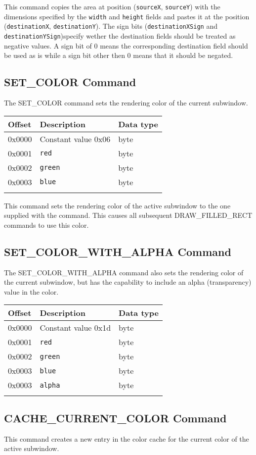 \documentclass{article}
\newcommand{\field}[1]{\textcolor{fieldColor}{\texttt{#1}}}
\newenvironment{bytelisting}
{\ttfamily \begin{center} \begin{tabular}{l l l} Offset & Description & Data type \\ \hline}
{\normalfont \end{tabular} \end{center}}
\begin{document}
This command copies the area at position (\field{sourceX}, \field{sourceY}) with the dimensions specified by the \field{width} and \field{height} fields and pastes it at the position 
(\field{destinationX}, \field{destinationY}). The sign bits (\field{destinationXSign} and \field{destinationYSign})specify wether the destination fields should be treated as negative values.
A sign bit of 0 means the corresponding destination field should be used as is while a sign bit other then 0 means that it should be negated.

\subsection{SET\_COLOR Command}
The SET\_COLOR command sets the rendering color of the current subwindow.

\begin{bytelisting}
0x0000 & Constant value 0x06 & byte \\
0x0001 & \field{red} & byte \\
0x0002 & \field{green} & byte \\
0x0003 & \field{blue} & byte \\
\end{bytelisting}

This command sets the rendering color of the active subwindow to the one supplied with the command. This causes all subsequent DRAW\_FILLED\_RECT commands to use this color.

\subsection{SET\_COLOR\_WITH\_ALPHA Command}
The SET\_COLOR\_WITH\_ALPHA command also sets the rendering color of the current subwindow, but has the capability to include an alpha (transparency) value in the color.

\begin{bytelisting}
0x0000 & Constant value 0x1d & byte \\
0x0001 & \field{red} & byte \\
0x0002 & \field{green} & byte \\
0x0003 & \field{blue} & byte \\
0x0003 & \field{alpha} & byte \\
\end{bytelisting}

\subsection{CACHE\_CURRENT\_COLOR Command}
This command creates a new entry in the color cache for the current color of the active subwindow.
\end{document}
